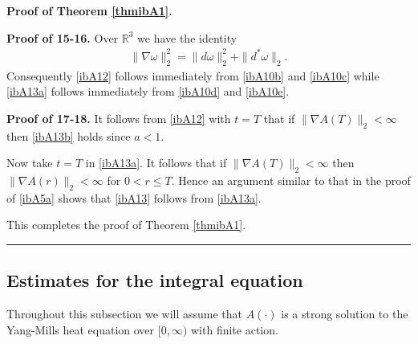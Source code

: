 \documentclass[12pt]{article}
\newenvironment{proof}[1][Proof]{\textbf{#1.} }{\ \rule{0.5em}{0.5em}}
\def \R{\mathbb R}
\def \w{\omega}
\def \n{\nabla}
\def \eref{\eqref}
\numberwithin{equation}{section}
\begin{document}
\begin{proof}[Proof of Theorem \ref{thmibA1}]
  
\bigskip
\noindent
{\bf Proof of 15-16.} 
Over $\R^3$ we have the identity
\begin{align}
\| \n \w\|_2^2 = \| d\w\|_2^2 + \| d^* \w \|_2.    \label{ibA60}
\end{align}
 Consequently \eref{ibA12} follows immediately from \eref{ibA10b} and \eref{ibA10c} while 
  \eref{ibA13a} follows immediately from  \eref{ibA10d} and \eref{ibA10e}.
  
  
\bigskip
\noindent
{\bf Proof of 17-18.} 
It follows from \eref{ibA12} with $t = T$ that if  $\|\n A(T)\|_2 < \infty$  then \eref{ibA13b} holds since $ a <1$.


Now take $t = T$ in \eref{ibA13a}. It follows that if $\|\n A(T)\|_2 < \infty$ then
$ \| \n A(r)\|_2 < \infty$ for $ 0< r \le T$. Hence
an argument similar to that in the proof of \eref{ibA5a} shows that \eref{ibA13} follows from \eref{ibA13a}.

This completes the proof of Theorem \ref{thmibA1}.
\end{proof}




\bigskip



\subsection{Estimates for the integral equation}  \label{secests}


Throughout this subsection we will assume that  $A(\cdot)$ is a strong solution to the Yang-Mills 
heat equation over $[0,\infty)$ with finite action. 
\end{document}
